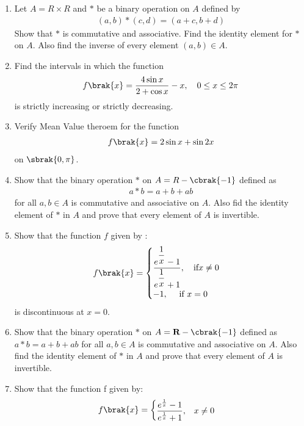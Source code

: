 \begin{enumerate}
	\item Let $A = R \times R$ and $*$ be a binary operation on $A$ defined by
	      \begin{align*}
		      (a, b) * (c, d) = (a + c, b + d)
	      \end{align*}
	      Show that $*$ is commutative and associative. Find the identity element for $*$
	      on $A$. Also find the inverse of every element $(a, b) \in A$.
	\item Find the intervals in which the function
	      \begin{align*}
		      f\brak{x}= \dfrac{4\sin x}{2+\cos x} -x,\quad 0 \leq x \leq 2\pi
	      \end{align*}
	      is strictly increasing or strictly decreasing.
	\item Verify Mean Value theroem for the function
	      \begin{align*}
		      f\brak{x}= 2\sin x + \sin 2x
	      \end{align*}
	      on $\sbrak{0,\pi}$.
	\item Show that the binary operation $*$ on $ A=R -\cbrak{-1}$ defined as
	      \begin{align*}
		      a*b= a+b+ab
	      \end{align*}
	      for all $a,b \in A$ is commutative and associative on $A$. Also fid the identity element of $*$ in $A$ and prove that every element of $A$ is invertible.\item Show that the function $f$ given by :
	      \begin{align*}
		      f\brak{x} = \begin{cases}
			                  \dfrac{e^{\dfrac{1}{x}}-1}{e^{\dfrac{1}{x}}+1} ,\quad \text{if} x\neq 0 \\
			                  -1,\quad \text{ if } x=0
		                  \end{cases}
	      \end{align*}
	      is discontinuous at $x=0$.
	\item Show that the binary operation $*$  on $A = \textbf{R} - \cbrak{-1}$ defined as $a*b = a + b + ab$ for all $a, b \in A$  is commutative and associative on $A$. Also find the identity element of $*$ in $A$ and prove that every element of $A$ is invertible.
	\item Show that the function f given by:
	      \begin{align*}
		      f\brak{x} & = \begin{cases}
			                    \dfrac{e^{\frac{1}{x}} - 1}{e^{\frac{1}{x}} + 1}, & x \neq 0 \\

\end{cases}
\end{align*}
\end{enumerate}
